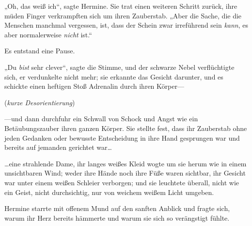 „Oh, das weiß ich“, sagte Hermine. Sie trat einen weiteren Schritt zurück, ihre müden Finger verkrampften sich um ihren Zauberstab. „Aber die Sache, die die Menschen manchmal vergessen, ist, dass der Schein zwar irreführend sein \emph{kann}, es aber normalerweise \emph{nicht} ist.“

Es entstand eine Pause.

„Du \emph{bist} sehr clever“, sagte die Stimme, und der schwarze Nebel verflüchtigte sich, er verdunkelte nicht mehr; sie erkannte das Gesicht darunter, und es schickte einen heftigen Stoß Adrenalin durch ihren Körper—

(\emph{kurze Desorientierung})

—und dann durchfuhr ein Schwall von Schock und Angst wie ein Betäubungszauber ihren ganzen Körper. Sie stellte fest, dass ihr Zauberstab ohne jeden Gedanken oder bewusste Entscheidung in ihre Hand gesprungen war und bereits auf jemanden gerichtet war…

…eine strahlende Dame, ihr langes weißes Kleid wogte um sie herum wie in einem unsichtbaren Wind; weder ihre Hände noch ihre Füße waren sichtbar, ihr Gesicht war unter einem weißen Schleier verborgen; und sie leuchtete überall, nicht wie ein Geist, nicht durchsichtig, nur von weichem weißem Licht umgeben.

Hermine starrte mit offenem Mund auf den sanften Anblick und fragte sich, warum ihr Herz bereits hämmerte und warum sie sich so verängstigt fühlte.

